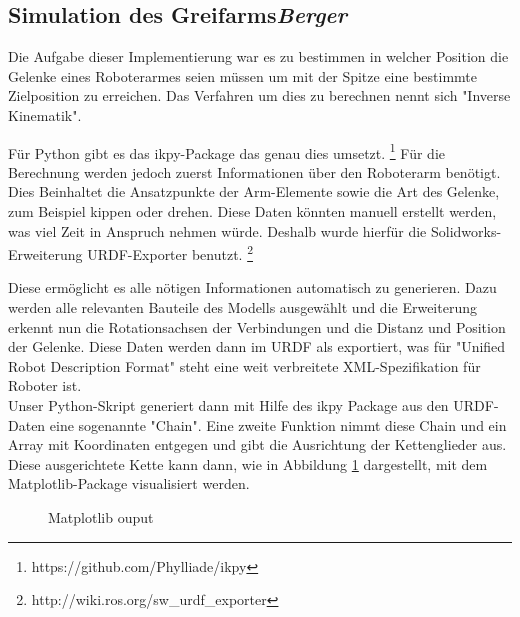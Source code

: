 \subsection{Simulation des Greifarms\hfill\textnormal{\emph{Berger}}}
Die Aufgabe dieser Implementierung war es
zu bestimmen in welcher Position die Gelenke eines Roboterarmes 
seien müssen um mit der Spitze eine bestimmte Zielposition zu erreichen.
Das Verfahren um dies zu berechnen nennt sich "Inverse Kinematik".

Für Python gibt es das ikpy-Package das genau dies umsetzt.
\footnote{https://github.com/Phylliade/ikpy}
Für die Berechnung werden jedoch zuerst Informationen über den Roboterarm benötigt.
Dies Beinhaltet die Ansatzpunkte der Arm-Elemente sowie die Art des Gelenke, 
zum Beispiel kippen oder drehen.
Diese Daten könnten manuell erstellt werden, 
was viel Zeit in Anspruch nehmen würde.
Deshalb wurde hierfür die Solidworks-Erweiterung URDF-Exporter benutzt.
\footnote{http://wiki.ros.org/sw\_urdf\_exporter}

Diese ermöglicht es alle nötigen Informationen automatisch zu generieren.
Dazu werden alle relevanten Bauteile des Modells ausgewählt
und die Erweiterung erkennt nun die Rotationsachsen der Verbindungen 
und die Distanz und Position der Gelenke.
Diese Daten werden dann im URDF als exportiert,
was für "Unified Robot Description Format" steht 
eine weit verbreitete XML-Spezifikation für Roboter ist.\cite{mathWorks}
\\

Unser Python-Skript generiert dann mit Hilfe des ikpy Package
aus den URDF-Daten eine sogenannte "Chain".
Eine zweite Funktion nimmt diese Chain und ein Array mit Koordinaten entgegen
und gibt die Ausrichtung der Kettenglieder aus.
Diese ausgerichtete Kette kann dann, 
wie in Abbildung \ref{fig:greifarm1} dargestellt,
mit dem Matplotlib-Package visualisiert werden.

\begin{figure}[H]
  \caption{Matplotlib ouput}
  \label{fig:greifarm1}
\end{figure}

